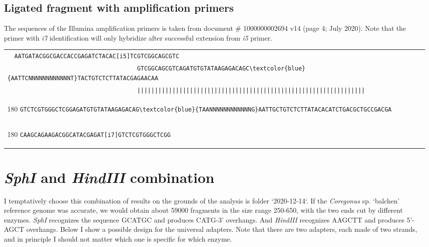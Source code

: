 \documentclass[a4paper,12pt]{article}
\begin{document}
\begin{flushleft}
\subsection*{Ligated fragment with amplification primers}
The sequences of the Illumina amplification primers is taken from document \# 1000000002694 v14 (page 4; July 2020). Note that the primer with \emph{i7} identification will only hybridize after successful extension from \emph{i5} primer.

\begin{tabular}{l}
   \Verb+  AATGATACGGCGACCACCGAGATCTACAC[i5]TCGTCGGCAGCGTC+\\[-6pt]
   \Verb+                                     GTCGGCAGCGTCAGATGTGTATAAGAGACAGC\textcolor{blue}{AATTCNNNNNNNNNNNNT}TACTGTCTCTTATACGAGAACAA+\\[-6pt]
   \Verb+                                     |||||||||||||||||||||||||||||||||||||||||||||||||||||||||||||||||+\\[-10pt]
   \begin{turn}{180}
      \Verb+GTCTCGTGGGCTCGGAGATGTGTATAAGAGACAG\textcolor{blue}{TAANNNNNNNNNNNNG}AATTGCTGTCTCTTATACACATCTGACGCTGCCGACGA                                   +
   \end{turn}
\\[-6pt]
   \begin{turn}{180}
      \Verb+CAAGCAGAAGACGGCATACGAGAT[i7]GTCTCGTGGGCTCGG                                                                                                            +
   \end{turn}
\\
\end{tabular}
\vspace*{0.3cm}

\section{\emph{SphI} and \emph{HindIII} combination}
I temptatively choose this combination of results on the grounds of the analysis is folder `2020-12-14`. If the \emph{Coregonus} sp. `balchen' reference genome was accurate, we would obtain about 59000 fragments in the size range 250-650, with the two ends cut by different enzymes. \emph{SphI} recognizes the sequence \textsf{GCATGC} and produces \textsf{CATG}-3' overhangs. And \emph{HindIII} recognizes \textsf{AAGCTT} and produces 5'-\textsf{AGCT} overhangs. Below I show a possible design for the universal adapters. Note that there are two adapters, each made of two strands, and in principle I should not matter which one is specific for which enzyme.


\end{flushleft}
\end{document}
